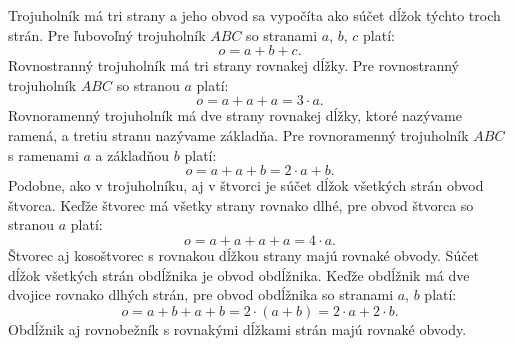 \documentclass{article}
\begin{document}
Trojuholník má tri strany a jeho obvod sa vypočíta ako súčet dĺžok týchto troch strán. Pre ľubovoľný trojuholník \(ABC\) so stranami \(a\), \(b\), \(c\) platí:
\[
o = a + b + c.
\]
Rovnostranný trojuholník má tri strany rovnakej dĺžky. Pre rovnostranný trojuholník \(ABC\) so stranou \(a\) platí:
\[
o = a + a + a = 3 \cdot a.
\]
Rovnoramenný trojuholník má dve strany rovnakej dĺžky, ktoré nazývame ramená, a tretiu stranu nazývame základňa. Pre rovnoramenný trojuholník \(ABC\) s ramenami \(a\) a základňou \(b\) platí:
\[
o = a + a + b = 2 \cdot a + b.
\]
Podobne, ako v trojuholníku, aj v štvorci je súčet dĺžok všetkých strán obvod štvorca. Keďže štvorec má všetky strany rovnako dlhé, pre obvod štvorca so stranou \(a\) platí:
\[
o = a + a + a + a = 4 \cdot a.
\]
Štvorec aj kosoštvorec s rovnakou dĺžkou strany majú rovnaké obvody.
Súčet dĺžok všetkých strán obdĺžnika je obvod obdĺžnika. Keďže obdĺžnik má dve dvojice rovnako dlhých strán, pre obvod obdĺžnika so stranami \(a\), \(b\) platí:
\[
o = a + b + a + b = 2 \cdot (a + b) = 2 \cdot a + 2 \cdot b.
\]
Obdĺžnik aj rovnobežník s rovnakými dĺžkami strán majú rovnaké obvody.
\end{document}
